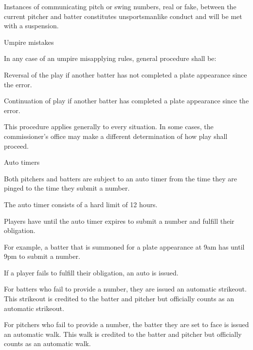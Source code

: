 \begin{deepEnumerate}
\begin{deepEnumerate}
		\item Instances of communicating pitch or swing numbers, real or fake, 
		between the current pitcher and batter constitutes unsportsmanlike conduct and will be met with a suspension.
		\item Umpire mistakes
		\begin{deepEnumerate}
			\item In any case of an umpire misapplying rules, general procedure shall be:
			\begin{deepEnumerate}
				\item Reversal of the play if another batter has not completed a plate appearance since the error.
				\item Continuation of play if another batter has completed a plate appearance since the error.
				\item This procedure applies generally to every situation. 
				In some cases, the commissioner’s office may make a different determination of how play shall proceed.
			\end{deepEnumerate}
		\end{deepEnumerate}
	\end{deepEnumerate}
	\item Auto timers
	\begin{deepEnumerate}
		\item Both pitchers and batters are subject to an auto timer from the time they are pinged to the time they submit a number.
		\item The auto timer consists of a hard limit of 12 hours.
		\item Players have until the auto timer expires to submit a number and fulfill their obligation.
		\begin{deepEnumerate}
			\item For example, a batter that is summoned for a plate appearance at 9am has until 9pm to submit a number.
		\end{deepEnumerate}
		\item If a player fails to fulfill their obligation, an auto is issued.
		\begin{deepEnumerate}
			\item For batters who fail to provide a number, they are issued an automatic strikeout. 
			This strikeout is credited to the batter and pitcher but officially counts as an automatic strikeout.
			\item For pitchers who fail to provide a number, the batter they are set to face is issued an automatic walk. 
			This walk is credited to the batter and pitcher but officially counts as an automatic walk.

\end{deepEnumerate}
\end{deepEnumerate}
\end{deepEnumerate}
